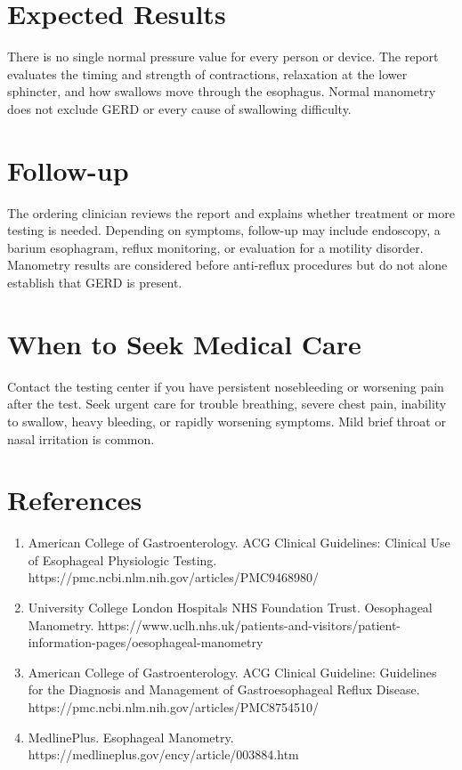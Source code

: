 \section*{Expected Results}
There is no single normal pressure value for every person or device. The report evaluates the timing and strength of contractions, relaxation at the lower sphincter, and how swallows move through the esophagus. Normal manometry does not exclude GERD or every cause of swallowing difficulty.

\section*{Follow-up}
The ordering clinician reviews the report and explains whether treatment or more testing is needed. Depending on symptoms, follow-up may include endoscopy, a barium esophagram, reflux monitoring, or evaluation for a motility disorder. Manometry results are considered before anti-reflux procedures but do not alone establish that GERD is present.

\section*{When to Seek Medical Care}
Contact the testing center if you have persistent nosebleeding or worsening pain after the test. Seek urgent care for trouble breathing, severe chest pain, inability to swallow, heavy bleeding, or rapidly worsening symptoms. Mild brief throat or nasal irritation is common.

\section*{References}
\begin{enumerate}
  \item American College of Gastroenterology. ACG Clinical Guidelines: Clinical Use of Esophageal Physiologic Testing. https://pmc.ncbi.nlm.nih.gov/articles/PMC9468980/
  \item University College London Hospitals NHS Foundation Trust. Oesophageal Manometry. https://www.uclh.nhs.uk/patients-and-visitors/patient-information-pages/oesophageal-manometry
  \item American College of Gastroenterology. ACG Clinical Guideline: Guidelines for the Diagnosis and Management of Gastroesophageal Reflux Disease. https://pmc.ncbi.nlm.nih.gov/articles/PMC8754510/
  \item MedlinePlus. Esophageal Manometry. https://medlineplus.gov/ency/article/003884.htm
\end{enumerate}

\clearpage
